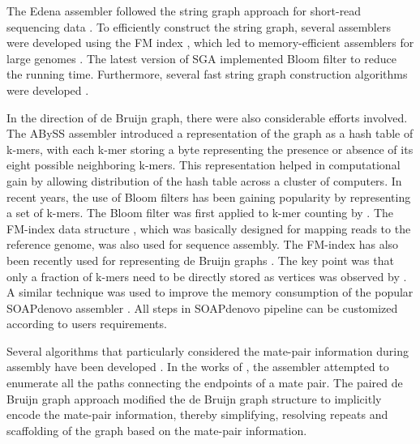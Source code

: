 The Edena assembler followed the string graph approach for short-read sequencing data \citep{hernandez2008novo}. 
To efficiently construct the string graph, several assemblers were developed using the FM index \citep{simpson2010efficient}, 
which led to memory-efficient assemblers for large genomes \citep{li2012exploring, simpson2012efficient}. The latest version of SGA implemented Bloom filter to reduce the running time.
Furthermore, several fast string graph construction algorithms were developed \citep{dinh2011memory, gonnella2012readjoiner, ben2014string}.
 
In the direction of de Bruijn graph, there were also considerable efforts involved.
The ABySS assembler \citep{simpson2009abyss} introduced a representation of
the graph as a hash table of k-mers, with each k-mer storing a byte representing the presence or absence of its eight possible
neighboring k-mers. This representation helped in computational gain by allowing distribution of the hash table across a cluster
of computers. In recent years, the use of Bloom filters \citep{bloom1970space} has been gaining popularity by representing a set of k-mers.
The Bloom filter was first applied to k-mer counting by \cite{melsted2011efficient}. 
The FM-index data structure \cite{ferragina2000opportunistic}, which was basically designed for mapping reads to the reference genome, was also used for
sequence assembly. 
The FM-index has also been recently used for representing de Bruijn graphs \citep{bowe2012succinct, rodland2013compact}.
The key point was that only a fraction of k-mers need to be directly stored as vertices was observed by \cite{ye2012exploiting}. A similar
technique was used to improve the memory consumption of the popular SOAPdenovo assembler \citep{luo2012soapdenovo2}.
All steps in SOAPdenovo pipeline can be customized according to users requirements.

Several algorithms that particularly considered the mate-pair information during assembly have been developed .
 In the works of \cite{butler2008allpaths, bankevich2012spades}, the assembler attempted to enumerate all the paths connecting the endpoints of a mate pair.
The paired de Bruijn graph \citep{medvedev2011paired} approach modified the de Bruijn graph
structure to implicitly encode the mate-pair information, thereby simplifying, resolving repeats and scaffolding of the graph based on the mate-pair information.
